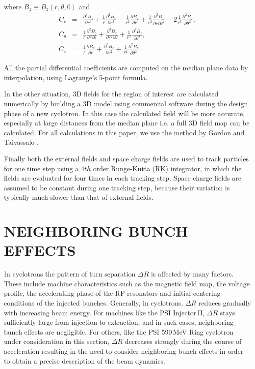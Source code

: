 \documentclass[aps,prstab,twocolumn,superscriptaddress,showpacs]{revtex4}
\begin{document}
where $B_z\equiv B_z(r, \theta, 0)$ and  
\begin{eqnarray}\label{eq:Bcoeff}
  C_r & = & \frac{\partial^3B_z}{\partial r^3} + \frac{1}{r}\frac{\partial^2 B_z}{\partial r^2} - \frac{1}{r^2}\frac{\partial B_z}{\partial r} 
        + \frac{1}{r^2}\frac{\partial^3 B_z}{\partial r \partial \theta^2} - 2\frac{1}{r^3}\frac{\partial^2 B_z}{\partial \theta^2}, \nonumber  \\    
  C_{\theta} & = & \frac{1}{r}\frac{\partial^2 B_z}{\partial r \partial \theta} + \frac{\partial^3 B_z}{\partial r^2 \partial \theta}
        + \frac{1}{r^2}\frac{\partial^3 B_z}{\partial \theta^3},  \\
  C_z & = & \frac{1}{r}\frac{\partial B_z}{\partial r} + \frac{\partial^2 B_z}{\partial r^2} + \frac{1}{r^2}\frac{\partial^2 B_z}{\partial \theta^2}. \nonumber
\end{eqnarray}

All the partial differential coefficients are computed on the median plane data by interpolation, using Lagrange's 5-point formula.

In the other situation, 3D fields for the region of interest are calculated numerically by building a 3D model using commercial software 
during the design phase of a new cyclotron. In this case the calculated field will be more accurate, especially at large distances from the median plane i.e. a
full 3D field map can be calculated. For all calculations in this paper, we use the method by Gordon and Taivassalo \cite{Gordon:2}.

Finally both the external fields and space charge fields are used to track particles for one time step using a 4$th$ order Runge-Kutta (RK) integrator, in which 
the fields are evaluated for four times in each tracking step. Space charge fields are assumed to be constant during one tracking step,
because their variation is typically much slower than that of external fields. 
    
\section{NEIGHBORING BUNCH EFFECTS}
In cyclotrons the pattern of turn separation $\Delta R$ is affected by many factors. These include machine characteristics such as the magnetic field map, 
the voltage profile, the accelerating phase of the RF resonators  and initial centering conditions of the injected bunches. 
Generally, in cyclotrons, $\Delta R$ reduces gradually  with increasing beam energy.
For machines like the PSI Injector\,II, $\Delta R$ stays sufficiently large from injection to extraction, and in such cases,  neighboring bunch effects are negligible. 
For others, like the PSI 590\,MeV Ring cyclotron under consideration in this section, $\Delta R$ decreases strongly during the course of acceleration resulting in the need to consider neighboring bunch effects in order to
obtain a precise description of the beam dynamics.
\end{document}
